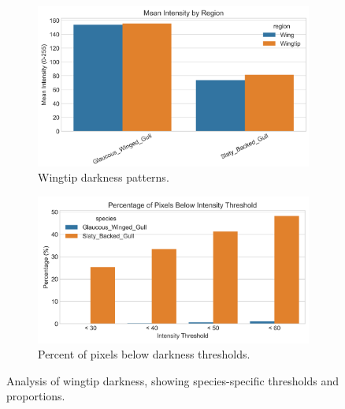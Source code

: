 \documentclass[a4paper,12pt]{report}
\begin{document}
\begin{figure}[H]
    \centering
    \begin{subfigure}[b]{0.48\textwidth}
        \centering
        \includegraphics[width=\textwidth]{images/REPORT_IMAGES_INTENSITY/I2/wingtip_darkness_analysis.png}
        \caption{Wingtip darkness patterns.}
        \label{fig:wingtip_darkness}
    \end{subfigure}
    \hfill
    \begin{subfigure}[b]{0.48\textwidth}
        \centering
        \includegraphics[width=\textwidth]{images/REPORT_IMAGES_INTENSITY/I2/pixelsbelowthresh.png}
        \caption{Percent of pixels below darkness thresholds.}
        \label{fig:pixels_below_thresh}
    \end{subfigure}
    \caption{Analysis of wingtip darkness, showing species-specific thresholds and proportions.}
    \label{fig:wingtip_darkness_combined}
\end{figure}
\end{document}
